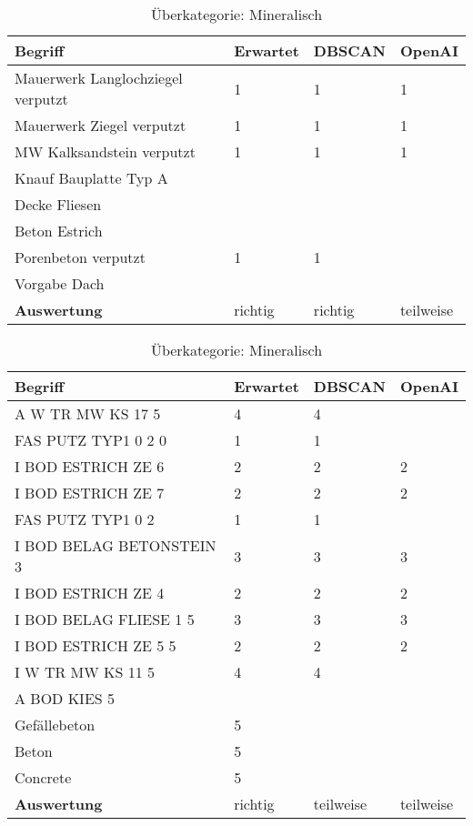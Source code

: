 \begin{table}[h]
	
	\centering
	\begin{tabular}{|l|l|l|l|}
		\hline
		\textbf{Begriff} & \textbf{Erwartet} & \textbf{DBSCAN} & \textbf{OpenAI}\\ \hline
		  Mauerwerk Langlochziegel verputzt & 1 & 1 & 1 \\ \hline
		Mauerwerk Ziegel verputzt & 1 & 1 & 1 \\ \hline
		MW Kalksandstein verputzt & 1 & 1 & 1 \\ \hline
		Knauf Bauplatte Typ A & ~ & ~ & ~ \\ \hline
		Decke Fliesen & ~ & ~ & ~ \\ \hline
		Beton Estrich & ~ & ~ & ~ \\ \hline
		Porenbeton verputzt & 1 & 1 & ~ \\ \hline
		Vorgabe Dach & ~ & ~ & ~ \\ \hline
		\textbf{Auswertung} & richtig & richtig & teilweise \\ \hline
	\end{tabular}
	\caption{Überkategorie: Mineralisch}
	\label{t:evaluation-example6}
\end{table}

\begin{table}[h]
	
	\centering
	\begin{tabular}{|l|l|l|l|}
		\hline
		\textbf{Begriff} & \textbf{Erwartet} & \textbf{DBSCAN} & \textbf{OpenAI}\\ \hline
		 A W TR MW KS 17 5 & 4 & 4 & ~ \\ \hline
		FAS PUTZ TYP1 0 2 0 & 1 & 1 & ~ \\ \hline
		I BOD ESTRICH ZE 6 & 2 & 2 & 2 \\ \hline
		I BOD ESTRICH ZE 7 & 2 & 2 & 2 \\ \hline
		FAS PUTZ TYP1 0 2 & 1 & 1 & ~ \\ \hline
		I BOD BELAG BETONSTEIN 3 & 3 & 3 & 3 \\ \hline
		I BOD ESTRICH ZE 4 & 2 & 2 & 2 \\ \hline
		I BOD BELAG FLIESE 1 5 & 3 & 3 & 3 \\ \hline
		I BOD ESTRICH ZE 5 5 & 2 & 2 & 2 \\ \hline
		I W TR MW KS 11 5 & 4 & 4 & ~ \\ \hline
		A BOD KIES 5 & ~ & ~ & ~ \\ \hline
		Gefällebeton & 5 & ~ & ~ \\ \hline
		Beton & 5 & ~ & ~ \\ \hline
		Concrete & 5 & ~ & ~ \\ \hline
		\textbf{Auswertung} & richtig & teilweise & teilweise \\ \hline
	\end{tabular}
	\caption{Überkategorie: Mineralisch}
	\label{t:evaluation-example7}
\end{table}

